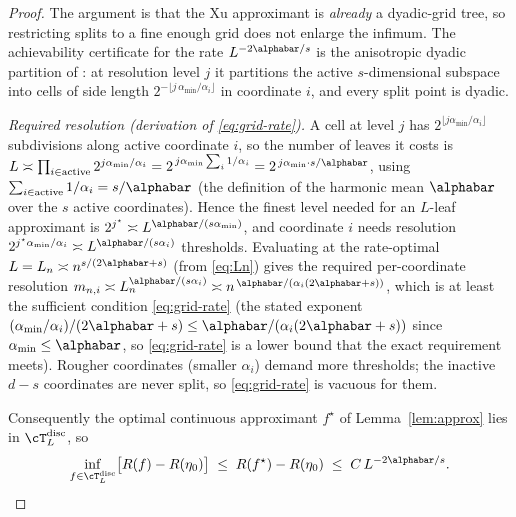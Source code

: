 \begin{proof}
The argument is that the Xu approximant is \emph{already} a dyadic-grid tree, so
restricting splits to a fine enough grid does not enlarge the infimum. The
achievability certificate for the rate $L^{-2\alphabar/s}$ is the anisotropic
dyadic partition of \citet[Appendix~E.4, Lemma~E.4, adapting Akakpo 2012]{xuStatisticalOptimalityOptimal2026}:
at resolution level $j$ it partitions the active $s$-dimensional subspace into
cells of side length $2^{-\lfloor j\,\alpha_{\min}/\alpha_i\rfloor}$ in
coordinate $i$, and every split point is dyadic.

\emph{Required resolution (derivation of \eqref{eq:grid-rate}).} A cell at level
$j$ has $2^{\lfloor j\alpha_{\min}/\alpha_i\rfloor}$ subdivisions along active
coordinate $i$, so the number of leaves it costs is
$L \asymp \prod_{i \in \text{active}} 2^{j\alpha_{\min}/\alpha_i}
= 2^{\,j\alpha_{\min}\sum_{i}1/\alpha_i}
= 2^{\,j\alpha_{\min}\cdot s/\alphabar}$,
using $\sum_{i\in\text{active}}1/\alpha_i = s/\alphabar$ (the definition of the
harmonic mean $\alphabar$ over the $s$ active coordinates). Hence the finest
level needed for an $L$-leaf approximant is
$2^{j^\star} \asymp L^{\alphabar/(s\alpha_{\min})}$, and coordinate $i$ needs
resolution
$2^{j^\star\alpha_{\min}/\alpha_i} \asymp L^{\alphabar/(s\alpha_i)}$
thresholds. Evaluating at the rate-optimal $L = L_n \asymp n^{s/(2\alphabar+s)}$
(from \eqref{eq:Ln}) gives the required per-coordinate resolution
$m_{n,i} \asymp L_n^{\alphabar/(s\alpha_i)}
\asymp n^{\,\alphabar/(\alpha_i(2\alphabar+s))}$, which is at least the sufficient
condition \eqref{eq:grid-rate} (the stated exponent
$(\alpha_{\min}/\alpha_i)/(2\alphabar+s) \le \alphabar/(\alpha_i(2\alphabar+s))$
since $\alpha_{\min}\le\alphabar$, so \eqref{eq:grid-rate} is a lower bound that
the exact requirement meets). Rougher coordinates (smaller $\alpha_i$) demand
more thresholds; the inactive $d-s$ coordinates are never split, so
\eqref{eq:grid-rate} is vacuous for them.

Consequently the optimal continuous approximant $f^\star$ of
Lemma~\ref{lem:approx} lies in $\cT_L^{\mathrm{disc}}$, so
\[
  \inf_{f \in \cT_L^{\mathrm{disc}}} \bigl[R(f) - R(\eta_0)\bigr]
  \;\le\; R(f^\star) - R(\eta_0)
  \;\le\; C\, L^{-2\alphabar/s}.
\]


\end{proof}
